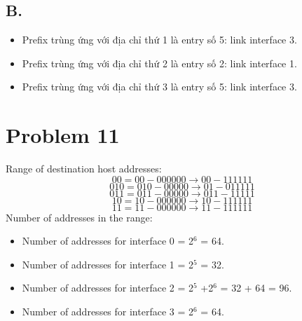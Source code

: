 \documentclass[12pt,a4paper]{article}
\begin{document}
\subsection*{B.}
\begin{itemize}
    \item Prefix trùng ứng với địa chỉ thứ 1 là entry số  5: link interface 3.
    \item Prefix trùng ứng với địa chỉ thứ 2 là entry số  2: link interface 1.
    \item Prefix trùng ứng với địa chỉ thứ 3 là entry số  5: link interface 3.
\end{itemize}

\section*{Problem 11}
Range of destination host addresses:
\begin{equation*}
    00 = 00-000000 \rightarrow 00-111111 
\end{equation*}
\begin{equation*}
    010 = 010-00000 \rightarrow 01-011111
\end{equation*}
\begin{equation*}
    011 = 011-00000 \rightarrow 011-11111
\end{equation*}
\begin{equation*}
    10 = 10-000000 \rightarrow 10-111111
\end{equation*}
\begin{equation*}
    11 = 11-000000 \rightarrow 11-111111
\end{equation*}
Number of addresses in the range:
\begin{itemize}
    \item Number of addresses for interface 0 = 2$^6$ = 64.
    \item Number of addresses for interface 1 = 2$^5$ = 32.
    \item Number of addresses for interface 2 = 2$^5$ +2$^6$ = 32 + 64 = 96.
    \item Number of addresses for interface 3 = 2$^6$ = 64.
\end{itemize}
\end{document}
